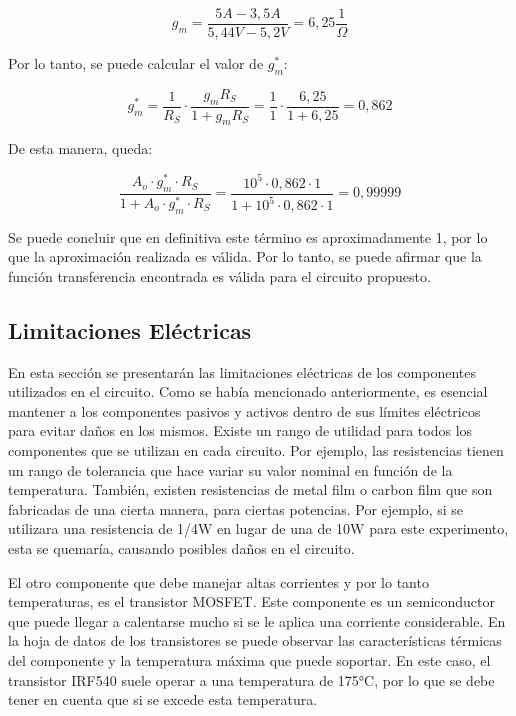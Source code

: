 \documentclass[12pt,oneside,a4paper]{article}
\begin{document}
\begin{equation}
    g_m = \frac{5A - 3,5A}{5,44V - 5,2V} = 6,25 \frac{1}{\Omega}
\end{equation}

Por lo tanto, se puede calcular el valor de $g_m^*$:

\begin{equation}
    g_m^* = \frac{1}{R_S} \cdot \frac{g_m R_S}{1 + g_m R_S} = \frac{1}{1} \cdot \frac{6,25}{1 + 6,25} = 0,862
\end{equation}

De esta manera, queda:

\begin{equation}
    \frac{A_o\cdot g_m^*\cdot R_S}{1 + A_o\cdot g_m^*\cdot R_S} = \frac{10^5 \cdot 0,862 \cdot 1}
    {1 + 10^5 \cdot 0,862 \cdot 1} = 0,99999
\end{equation}

Se puede concluir que en definitiva este término es aproximadamente 1, por lo que la aproximación
realizada es válida. Por lo tanto, se puede afirmar que la función transferencia encontrada es
válida para el circuito propuesto.

\subsection{Limitaciones Eléctricas}
En esta sección se presentarán las limitaciones eléctricas de los componentes utilizados en el circuito.
Como se había mencionado anteriormente, es esencial mantener a los componentes pasivos y activos dentro de 
sus límites eléctricos para evitar daños en los mismos. Existe un rango de utilidad para todos los componentes 
que se utilizan en cada circuito. Por ejemplo, las resistencias tienen un rango de tolerancia que hace variar 
su valor nominal en función de la temperatura. También, existen resistencias de metal film o carbon film que 
son fabricadas de una cierta manera, para ciertas potencias. Por ejemplo, si se utilizara una resistencia de 
1/4W en lugar de una de 10W para este experimento, esta se quemaría, causando posibles daños en el circuito.

El otro componente que debe manejar altas corrientes y por lo tanto temperaturas, es el transistor MOSFET. 
Este componente es un semiconductor que puede llegar a calentarse mucho si se le aplica una corriente 
considerable. En la hoja de datos de los transistores se puede observar las características térmicas del 
componente y la temperatura máxima que puede soportar. En este caso, el transistor IRF540 suele operar 
a una temperatura de 175°C, por lo que se debe tener en cuenta que si se excede esta temperatura.
\end{document}
